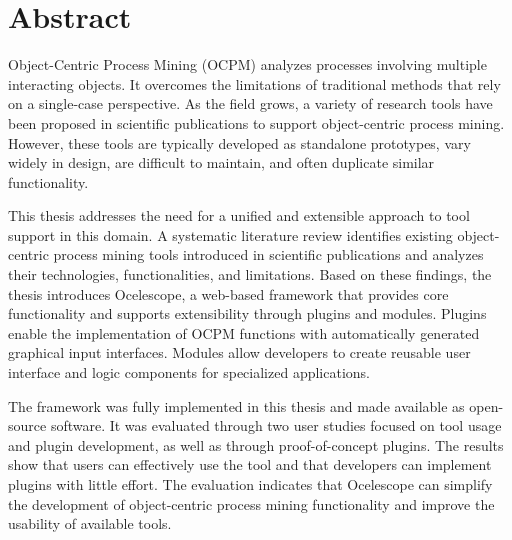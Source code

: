 \chapter*{Abstract}

Object-Centric Process Mining (OCPM) analyzes processes involving multiple interacting objects.
It overcomes the limitations of traditional methods that rely on a single-case perspective.
As the field grows, a variety of research tools have been proposed in scientific publications to support object-centric process mining.
However, these tools are typically developed as standalone prototypes, vary widely in design, are difficult to maintain, and often duplicate similar functionality.

This thesis addresses the need for a unified and extensible approach to tool support in this domain.
A systematic literature review identifies existing object-centric process mining tools introduced in scientific publications and analyzes their technologies, functionalities, and limitations.
Based on these findings, the thesis introduces Ocelescope, a web-based framework that provides core functionality and supports extensibility through plugins and modules.
Plugins enable the implementation of OCPM functions with automatically generated graphical input interfaces.
Modules allow developers to create reusable user interface and logic components for specialized applications.

The framework was fully implemented in this thesis and made available as open-source software.
It was evaluated through two user studies focused on tool usage and plugin development, as well as through proof-of-concept plugins.
The results show that users can effectively use the tool and that developers can implement plugins with little effort.
The evaluation indicates that Ocelescope can simplify the development of object-centric process mining functionality and improve the usability of available tools.

